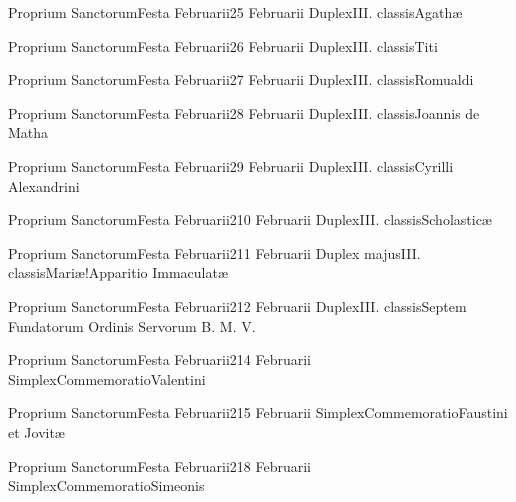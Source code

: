 \documentclass[invitatoriale-romanum.tex]{subfiles}
\begin{document}
	{Proprium Sanctorum}{Festa Februarii}{2}{5 Februarii}
	{Duplex}{III. classis}{Agathæ}
	{}
	{}

	{Proprium Sanctorum}{Festa Februarii}{2}{6 Februarii}
	{Duplex}{III. classis}{Titi}
	{}
	{}

	{Proprium Sanctorum}{Festa Februarii}{2}{7 Februarii}
	{Duplex}{III. classis}{Romualdi}
	{}
	{}

	{Proprium Sanctorum}{Festa Februarii}{2}{8 Februarii}
	{Duplex}{III. classis}{Joannis de Matha}
	{}
	{}

	{Proprium Sanctorum}{Festa Februarii}{2}{9 Februarii}
	{Duplex}{III. classis}{Cyrilli Alexandrini}
	{}
	{}

	{Proprium Sanctorum}{Festa Februarii}{2}{10 Februarii}
	{Duplex}{III. classis}{Scholasticæ}
	{}
	{}

	{Proprium Sanctorum}{Festa Februarii}{2}{11 Februarii}
	{Duplex majus}{III. classis}{Mariæ!Apparitio Immaculatæ}
	{}
	{}

	{Proprium Sanctorum}{Festa Februarii}{2}{12 Februarii}
	{Duplex}{III. classis}{Septem Fundatorum Ordinis Servorum B. M. V.}
	{}
	{}

	{Proprium Sanctorum}{Festa Februarii}{2}{14 Februarii}
	{Simplex}{Commemoratio}{Valentini}
	{}
	{\invitferia}

	{Proprium Sanctorum}{Festa Februarii}{2}{15 Februarii}
	{Simplex}{Commemoratio}{Faustini et Jovitæ}
	{}
	{\invitferia}

	{Proprium Sanctorum}{Festa Februarii}{2}{18 Februarii}
	{Simplex}{Commemoratio}{Simeonis}
	{}
	{\invitferia}

\newpage
\end{document}
